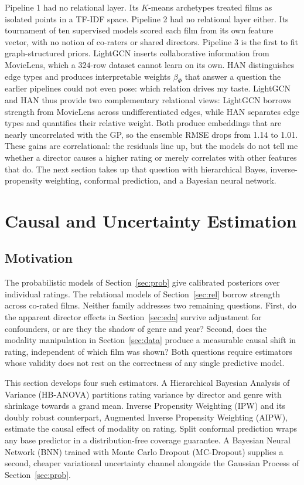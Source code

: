 \documentclass{article}
\begin{document}
Pipeline 1 had no relational layer. Its $K$-means archetypes treated films as isolated points in a TF-IDF space. Pipeline 2 had no relational layer either. Its tournament of ten supervised models scored each film from its own feature vector, with no notion of co-raters or shared directors. Pipeline 3 is the first to fit graph-structured priors. LightGCN inserts collaborative information from MovieLens, which a $324$-row dataset cannot learn on its own. HAN distinguishes edge types and produces interpretable weights $\beta_\Phi$ that answer a question the earlier pipelines could not even pose: which relation drives my taste. LightGCN and HAN thus provide two complementary relational views: LightGCN borrows strength from MovieLens across undifferentiated edges, while HAN separates edge types and quantifies their relative weight. Both produce embeddings that are nearly uncorrelated with the GP, so the ensemble RMSE drops from 1.14 to 1.01. These gains are correlational: the residuals line up, but the models do not tell me whether a director causes a higher rating or merely correlates with other features that do. The next section takes up that question with hierarchical Bayes, inverse-propensity weighting, conformal prediction, and a Bayesian neural network.


\section{Causal and Uncertainty Estimation}
\label{sec:causal}

\subsection{Motivation}

The probabilistic models of Section~\ref{sec:prob} give calibrated posteriors over individual ratings. The relational models of Section~\ref{sec:rel} borrow strength across co-rated films. Neither family addresses two remaining questions. First, do the apparent director effects in Section~\ref{sec:eda} survive adjustment for confounders, or are they the shadow of genre and year? Second, does the modality manipulation in Section~\ref{sec:data} produce a measurable causal shift in rating, independent of which film was shown? Both questions require estimators whose validity does not rest on the correctness of any single predictive model.

This section develops four such estimators. A Hierarchical Bayesian Analysis of Variance (HB-ANOVA) partitions rating variance by director and genre with shrinkage towards a grand mean. Inverse Propensity Weighting (IPW) and its doubly robust counterpart, Augmented Inverse Propensity Weighting (AIPW), estimate the causal effect of modality on rating. Split conformal prediction wraps any base predictor in a distribution-free coverage guarantee. A Bayesian Neural Network (BNN) trained with Monte Carlo Dropout (MC-Dropout) supplies a second, cheaper variational uncertainty channel alongside the Gaussian Process of Section~\ref{sec:prob}.
\end{document}
